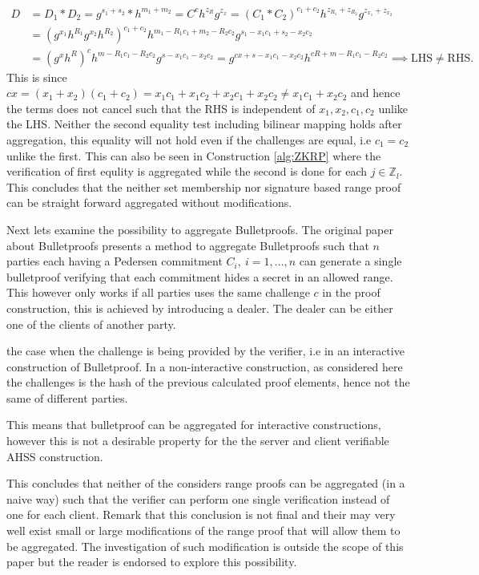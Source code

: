 \begin{align*}
D &= D_1*D_2 = g^{s_1+s_2}*h^{m_1+m_2} = C^ch^{z_R}g^{z_x} = (C_1*C_2)^{c_1+c_2}h^{z_{R_1}+z_{R_2}}g^{z_{x_1}+z_{x_2}}\\ 
&=(g^{x_1}h^{R_1}g^{x_2}h^{R_2}) ^{c_1+c_2}  h^{m_1-R_1c_1+m_2-R_2c_2} g^{s_1- x_1c_1+s_2-x_2c_2} \\
&=(g^{x}h^{R})^{c}  h^{m-R_1c_1-R_2c_2} g^{s-x_1c_1-x_2c_2} = g^{cx+s-x_1c_1-x_2c_2}h^{cR+m-R_1c_1-R_2c_2} \implies \text{LHS}\neq \text{RHS}.
\end{align*}
This is since $ cx = (x_1+x_2)(c_1+c_2) = x_1c_1+x_1c_2+x_2c_1+x_2c_2 \neq x_1c_1 + x_2c_2$ and hence the terms does not cancel such that the RHS is independent of $x_1,x_2,c_1,c_2$ unlike the LHS. Neither the  second equality test including  bilinear mapping holds after aggregation, this equality will not hold even if the challenges are equal, i.e $c_1=c_2$ unlike the first. This can also be seen in Construction \ref{alg:ZKRP} where the verification of first equlity is aggregated while the second is done for each $j\in\mathds{Z}_l$. This concludes that the neither set membership nor signature based range proof can be straight forward aggregated without modifications.  

Next lets examine the possibility to aggregate Bulletproofs. The original paper about Bulletproofs \cite{bulletProofs_theory} presents a method to aggregate Bulletproofs such that $n$ parties each having a Pedersen commitment $C_i,\: i=1,...,n$ can generate a single bulletproof verifying that each commitment hides a secret in an allowed range. This however only works if all parties uses the same challenge $c$ in the proof construction, this is achieved by introducing a dealer. The dealer can be either one of the clients of another party. 


the case when the challenge is being provided by the verifier, i.e in an interactive construction of Bulletproof. In a non-interactive construction, as considered here the challenges is the hash of the previous calculated proof elements, hence not the same of different parties. 

This means that bulletproof can be aggregated for interactive constructions, however this is not a desirable property for the the server and client verifiable AHSS construction. 

This concludes that neither of the considers range proofs can be aggregated  (in a naive way) such that the verifier can perform one single verification instead of one for each client. Remark that this conclusion is not final and their may very well exist small or large modifications of the range proof that will allow them to be aggregated. The investigation of such modification is outside the scope of this paper but the reader is endorsed to explore this possibility. 

